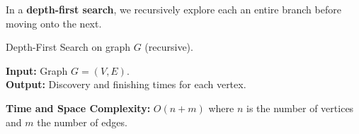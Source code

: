     \newpage
    \begin{Def}

        In a \textbf{depth-first search}, we recursively explore each an entire branch before moving onto the next.
    \end{Def}

    \begin{Func}
        Depth-First Search on graph $G$ (recursive).
    
        \vspace{.5em}
        \noindent
        \textbf{Input:} Graph $G = (V, E)$.\\
        \textbf{Output:} Discovery and finishing times for each vertex.
        
        \begin{algorithm}[H]
            \SetAlgoLined
            \vspace{.5em}
        \end{algorithm}

        \noindent
        \textbf{Time and Space Complexity:} $O(n+m)$ where $n$ is the number of vertices and $m$ the number of edges.
    \end{Func}

    \newpage

